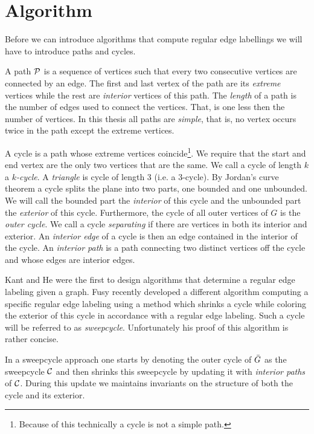 
\section{Algorithm}
\thispagestyle{plain}
\label{s:algo}

Before we can introduce algorithms that compute regular edge labellings we will have to introduce paths and cycles.

  A path $\P$ is a sequence of vertices such that every two consecutive vertices are connected by an edge. The first and last vertex of the path are its \emph{extreme} vertices while the rest are \emph{interior} vertices of this path. The \emph{length} of a path is the number of edges used to connect the vertices. That, is one less then the number of vertices. In this thesis all paths are \emph{simple}, that is, no vertex occurs twice in the path except the extreme vertices.

  A cycle is a path whose extreme vertices coincide\footnote{Because of this technically a cycle is not a simple path.}. We require that the start and end vertex are the only two vertices that are the same. We call a cycle of length $k$  a \emph{$k$-cycle}. A \emph{triangle} is cycle of length $3$ (i.e. a $3$-cycle). By Jordan's curve theorem a cycle splits the plane into two parts, one bounded and one unbounded. We will call the bounded part the \emph{interior} of this cycle and the unbounded part the \emph{exterior} of this cycle.
  Furthermore, the cycle of all outer vertices of $G$ is the \emph{outer cycle}.
  We call a cycle \emph{separating} if there are vertices in both its interior and exterior.
  An \emph{interior edge} of a cycle is then an edge contained in the interior of the cycle.
  An \emph{interior path} is a path connecting two distinct vertices off the cycle and whose edges are interior edges.

  Kant and He \cite{Kant1997} were the first to design algorithms that determine a regular edge labeling given a graph. Fusy \cite{Fusy2006} recently developed a different algorithm computing a specific regular edge labeling using a method which shrinks a cycle while coloring the exterior of this cycle in accordance with a regular edge labeling. Such a cycle will be referred to as \emph{sweepcycle}. Unfortunately his proof of this algorithm is rather concise.

  In a sweepcycle approach one starts by denoting the outer cycle of $\ext G$ as the sweepcycle $\C$ and then shrinks this sweepcycle by updating it with \emph{interior paths} of $\C$. During this update we maintains invariants on the structure of both the cycle and its exterior.

